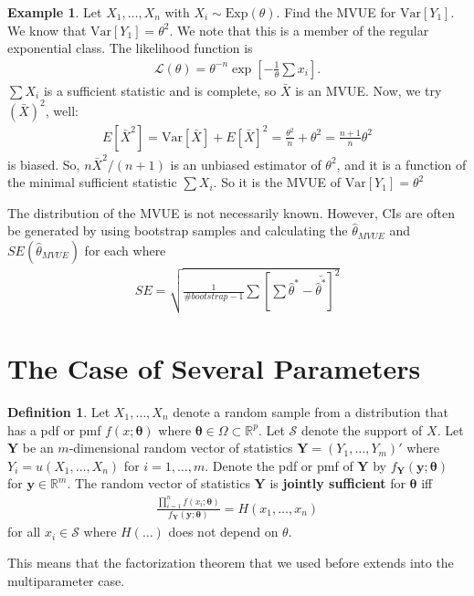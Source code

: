 \documentclass{book}
\theoremstyle{definition}
\newtheorem{defn}{Definition}[section]
\newtheorem{exmp}{Example}[section]
\newcommand{\lag}{\mathcal{L}}
\newcommand{\Var}{\text{Var}}
\newcommand{\f}[2]{\frac{#1}{#2}}
\newcommand{\lb}{\left[}
\newcommand{\rb}{\right]}
\begin{document}
\begin{exmp}
	Let $X_1,\dots, X_n$ with $X_i \sim \mbox{Exp}(\theta)$. Find the MVUE for $\Var[Y_1]$. We know that $\Var[Y_1] = \theta^2$. We note that this is a member of the regular exponential class. The likelihood function is
	\begin{align}
	\lag(\theta) = \theta^{-n}\exp\lb -\f{1}{\theta}\sum x_i \rb.	
	\end{align}
	$\sum X_i$ is a sufficient statistic and is complete, so $\bar{X}$ is an MVUE. Now, we try $(\bar{X})^2$, well:
	\begin{align}
	E[\bar{X}^2] = \Var[\bar{X}] +  E[\bar{X}]^2 = \f{\theta^2}{n} + \theta^2 = \f{n+1}{n}\theta^2
	\end{align} 
	is biased. So, $n\bar{X}^2/(n+1)$ is an unbiased estimator of $\theta^2$, and it is a function of the minimal sufficient statistic $\sum X_i$. So it is the MVUE of $\Var[Y_1] = \theta^2$
	
\end{exmp}




The distribution of the MVUE is not necessarily known. However, CIs are often be generated by using bootstrap samples and calculating the $\hat\theta_{MVUE}$ and $SE(\hat\theta_{MVUE})$ for each where
\begin{align}
SE = \sqrt{\f{1}{\#bootstrap - 1}\sum \lb \sum \hat\theta^* - \bar{\hat\theta^*} \rb^2 }
\end{align}







\section{The Case of Several Parameters}

\begin{defn}
	Let $X_1,\dots,X_n$ denote a random sample from a distribution that has a pdf or pmf $f(x;\bm{\theta})$ where $\bm\theta \in \Omega \subset \mathbb{R}^p$. Let $\mathcal{S}$ denote the support of $X$. Let $\bm Y$ be an $m$-dimensional random vector of statistics $\bm Y = (Y_1,\dots, Y_m)'$ where $Y_i = u(X_1,\dots,X_n)$ for $i=1,\dots,m$. Denote the pdf or pmf of $\bm Y$ by $f_{\bm Y}(\bm y; \bm\theta)$ for  $\bm y \in \mathbb{R}^m$. The random vector of statistics $\bm Y$ is \textbf{jointly sufficient} for $\bm \theta$ iff 
	\begin{align}
	\f{\prod^n_{i=1} f(x_i;\bm\theta) }{f_{\bm Y}(\bm y;\bm\theta)} = H(x_1,\dots,x_n)
	\end{align}
	for all $x_i \in \mathcal{S}$ where $H(\dots)$ does not depend on $\theta$. 
\end{defn}
This means that the factorization theorem that we used before extends into the multiparameter case. 
\end{document}
